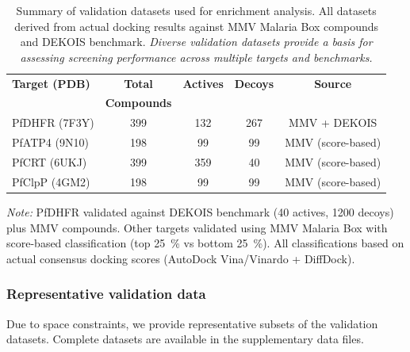 \documentclass[journal=jcisd8,manuscript=suppinfo]{achemso}
\begin{document}
\begin{table}[htbp]
\centering
\caption{Summary of validation datasets used for enrichment analysis. All datasets derived from actual docking results against MMV Malaria Box compounds and DEKOIS benchmark. \textit{Diverse validation datasets provide a basis for assessing screening performance across multiple targets and benchmarks.}}
\label{tab:si_validation_summary}
\small
\begin{tabular}{lcccc}
\toprule
\textbf{Target (PDB)} & \textbf{Total} & \textbf{Actives} & \textbf{Decoys} & \textbf{Source} \\
 & \textbf{Compounds} & & & \\
\midrule
PfDHFR (7F3Y) & \num{399} & \num{132} & \num{267} & MMV + DEKOIS \\
PfATP4 (9N10) & \num{198} & \num{99} & \num{99} & MMV (score-based) \\
PfCRT (6UKJ) & \num{399} & \num{359} & \num{40} & MMV (score-based) \\
PfClpP (4GM2) & \num{198} & \num{99} & \num{99} & MMV (score-based) \\
\bottomrule
\end{tabular}
\vspace{0.3em}
\begin{footnotesize}
\textit{Note:} PfDHFR validated against DEKOIS benchmark (\num{40} actives, \num{1200} decoys) plus MMV compounds. Other targets validated using MMV Malaria Box with score-based classification (top \qty{25}{\percent} vs bottom \qty{25}{\percent}). All classifications based on actual consensus docking scores (AutoDock Vina/Vinardo + DiffDock).
\end{footnotesize}
\end{table}

\subsubsection*{Representative validation data}

Due to space constraints, we provide representative subsets of the validation datasets. Complete datasets are available in the supplementary data files.
\end{document}
